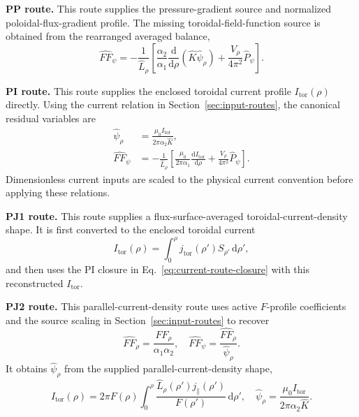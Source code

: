 \documentclass[final, 3p, times]{elsarticle}
\newcommand{\routeclosure}[1]{\par\medskip\noindent\textbf{#1.}\quad}
\begin{document}
\routeclosure{PP route}
This route supplies the pressure-gradient source and normalized poloidal-flux-gradient profile. The missing toroidal-field-function source is obtained from the rearranged averaged balance,
\begin{equation*}
    \hat{FF}_\psi
    =-\frac{1}{\hat{L}_\rho}
    \left[
        \frac{\alpha_2}{\alpha_1}
        \frac{\mathrm{d}}{\mathrm{d}\rho}
        \left(\hat{K}\hat{\psi}_\rho\right)
        +\frac{V_\rho}{4\pi^2}\hat{P}_\psi
        \right].
\end{equation*}

\routeclosure{PI route}
This route supplies the enclosed toroidal current profile $I_{\mathrm{tor}}(\rho)$ directly. Using the current relation in Section~\ref{sec:input-routes}, the canonical residual variables are
\begin{align}
    \hat{\psi}_\rho
     & =\frac{\mu_0 I_{\mathrm{tor}}}{2\pi\alpha_2\hat{K}}, \\
    \hat{FF}_\psi
     & =-\frac{1}{\hat{L}_\rho}
    \left[
    \frac{\mu_0}{2\pi\alpha_1}
    \frac{\mathrm{d}I_{\mathrm{tor}}}{\mathrm{d}\rho}
    +\frac{V_\rho}{4\pi^2}\hat{P}_\psi
    \right].
    \label{eq:current-route-closure}
\end{align}
Dimensionless current inputs are scaled to the physical current convention before applying these relations.

\routeclosure{PJ1 route}
This route supplies a flux-surface-averaged toroidal-current-density shape. It is first converted to the enclosed toroidal current
\begin{equation*}
    I_{\mathrm{tor}}(\rho)
    =\int_0^\rho j_{\mathrm{tor}}(\rho')S_{\rho'}\,\mathrm{d}\rho',
\end{equation*}
and then uses the PI closure in Eq.~\eqref{eq:current-route-closure} with this reconstructed $I_{\mathrm{tor}}$.

\routeclosure{PJ2 route}
This parallel-current-density route uses active $F$-profile coefficients and the source scaling in Section~\ref{sec:input-routes} to recover
\begin{equation*}
    \hat{FF}_\rho=\frac{FF_\rho}{\alpha_1\alpha_2},
    \quad
    \hat{FF}_\psi=\frac{\hat{FF}_\rho}{\hat{\psi}_\rho} .
\end{equation*}
It obtains $\hat{\psi}_\rho$ from the supplied parallel-current-density shape,
\begin{equation*}
    I_{\mathrm{tor}}(\rho)
    =2\pi F(\rho)\int_0^\rho
    \frac{\hat{L}_\rho(\rho')j_\parallel(\rho')}{F(\rho')}\,\mathrm{d}\rho', \quad \hat{\psi}_\rho
    =\frac{\mu_0 I_{\mathrm{tor}}}{2\pi\alpha_2\hat{K}} .
\end{equation*}
\end{document}
